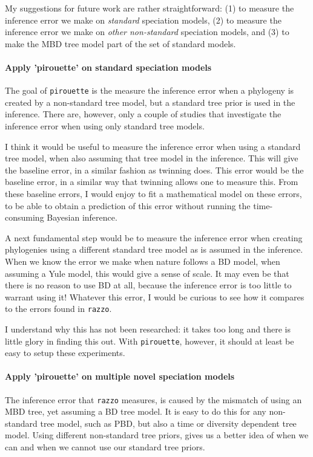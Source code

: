 My suggestions for future work are rather straightforward:
(1) to measure the inference error we make on \emph{standard}
speciation models, (2) to measure the inference error we make 
on \emph{other non-standard} speciation models, and (3) to
make the MBD tree model part of the set of standard models.

\paragraph{Apply 'pirouette' on standard speciation models} 

The goal of \verb;pirouette; is the measure the inference error
when a phylogeny is created by a non-standard tree model,
but a standard tree prior is used in the inference. There are,
however, only a couple of studies that investigate the
inference error when using only standard tree models.

I think it would be useful to measure the inference
error when using a standard tree model, when also
assuming that tree model in the inference. This will give the
baseline error, in a similar fashion as twinning does.
This error would be the baseline error, in a similar way that
twinning allows one to measure this. From these baseline errors,
I would enjoy to fit a mathematical model on these errors,
to be able to obtain a prediction of this error without running
the time-consuming Bayesian inference.

A next fundamental step would be to measure the inference
error when creating phylogenies using a different standard tree model
as is assumed in the inference. 
When we know the error we make when nature follows a BD model,
when assuming a Yule model, this would give a sense of scale.
It may even be that there is no reason to use BD at all,
because the inference error is too little to warrant using it!
Whatever this error, I would be curious to see how it compares
to the errors found in \verb;razzo;. 

I understand why this has not been researched: it takes too long
and there is little glory in finding this out. With \verb;pirouette;, however,
it should at least be easy to setup these experiments.

\paragraph{Apply 'pirouette' on multiple novel speciation models} 

The inference error that \verb;razzo; measures, is caused by the
mismatch of using an MBD tree, yet assuming a BD tree model.
It is easy to do this for any non-standard tree model, such as
PBD, but also a time or diversity dependent tree model. Using
different non-standard tree priors, gives us a better idea of when we can
and when we cannot use our standard tree priors.

